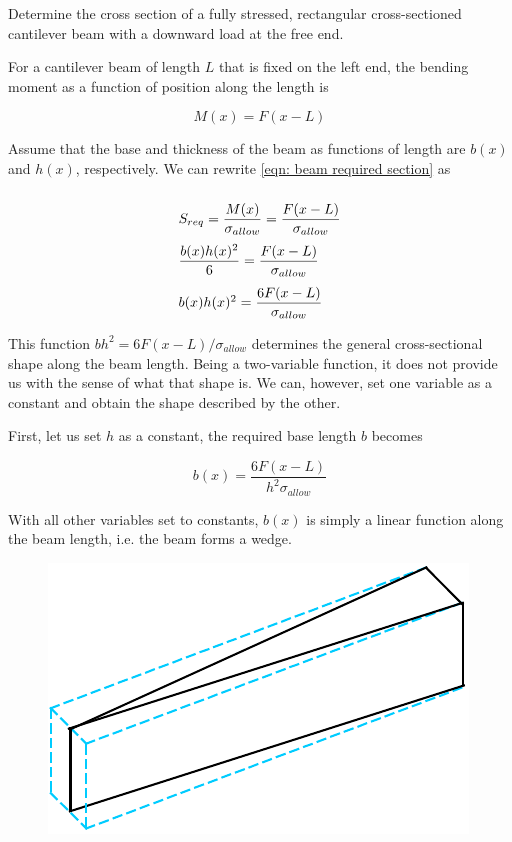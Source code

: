 \documentclass[
10pt,
a4paper,
openany,
svgnames,
]{book}
\begin{document}
\begin{example}

  Determine the cross section of a fully stressed, rectangular cross-sectioned cantilever beam with a downward load at the free end.
\end{example}

\begin{solution}
  For a cantilever beam of length $L$ that is fixed on the left end, the bending moment as a function of position along the length is

  \[M(x) = F(x-L)\]

  Assume that the base and thickness of the beam as functions of length are $b(x)$ and $h(x)$, respectively. We can rewrite \cref{eqn: beam required section} as

  \[{\renewcommand{\arraystretch}{2.5}
  \begin{array}{l}
    S_{req} = \dfrac{M(x)}{\sigma_{allow}} = \dfrac{F(x-L)}{\sigma_{allow}} \\
    \dfrac{b(x)h(x)^2}{6} = \dfrac{F(x-L)}{\sigma_{allow}} \\
    b(x)h(x)^2 = \dfrac{6F(x-L)}{\sigma_{allow}}
  \end{array}}\]

This function $bh^2 = 6F(x-L)/\sigma_{allow}$ determines the general cross-sectional shape along the beam length. Being a two-variable function, it does not provide us with the sense of what that shape is. We can, however, set one variable as a constant and obtain the shape described by the other.

First, let us set $h$ as a constant, the required base length $b$ becomes

\[b(x) = \dfrac{6F(x-L)}{h^2 \sigma_{allow}}\]

With all other variables set to constants, $b(x)$ is simply a linear function along the beam length, i.e. the beam forms a wedge.

\begin{figure}[H]
  \centering
  \includegraphics[scale=0.7]{pictures/Simple-load-bearing/fully-stressed-wedge}
\end{figure}


\end{solution}
\end{document}
